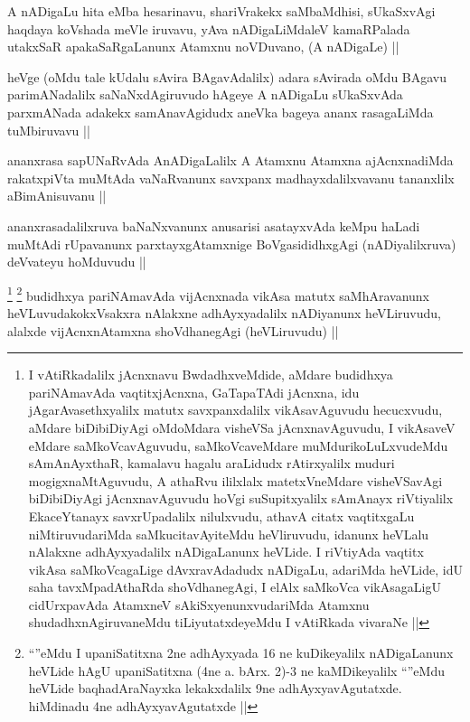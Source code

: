 
\begin{artha}
A nADigaLu hita eMba hesarinavu, shariVrakekx saMbaMdhisi, sUkaSxvAgi haqdaya koVshada meVle iruvavu, yAva nADigaLiMdaleV kamaRPalada utakxSaR apakaSaRgaLanunx Atamxnu noVDuvano, (A nADigaLe) ||
\end{artha}


\begin{artha}
heVge (oMdu tale kUdalu sAvira BAgavAdalilx) adara sAvirada oMdu BAgavu parimANadalilx saNaNxdAgiruvudo hAgeye A nADigaLu sUkaSxvAda parxmANada adakekx samAnavAgidudx aneVka bageya ananx rasagaLiMda tuMbiruvavu ||
\end{artha}


\begin{artha}
ananxrasa sapUNaRvAda AnADigaLalilx A Atamxnu Atamxna ajAcnxnadiMda rakatxpiVta muMtAda vaNaRvanunx savxpanx madhayxdalilxvavanu tananxlilx aBimAnisuvanu ||
\end{artha}

\begin{artha}
ananxrasadalilxruva baNaNxvanunx anusarisi asatayxvAda keMpu haLadi muMtAdi rUpavanunx parxtayxgAtamxnige BoVgasididhxgAgi (nADiyalilxruva) deVvateyu hoMduvudu ||
\end{artha}


\begin{artha}
\footnote{I vAtiRkadalilx jAcnxnavu BwdadhxveMdide, aMdare budidhxya pariNAmavAda vaqtitxjAcnxna, GaTapaTAdi jAcnxna, idu jAgarAvasethxyalilx matutx savxpanxdalilx vikAsavAguvudu hecucxvudu, aMdare biDibiDiyAgi oMdoMdara visheVSa jAcnxnavAguvudu, I vikAsaveV eMdare saMkoVcavAguvudu, saMkoVcaveMdare muMdurikoLuLxvudeMdu sAmAnAyxthaR, kamalavu hagalu araLidudx rAtirxyalilx muduri mogigxnaMtAguvudu, A athaRvu ililxlalx matetxVneMdare visheVSavAgi biDibiDiyAgi jAcnxnavAguvudu hoVgi suSupitxyalilx sAmAnayx riVtiyalilx EkaceYtanayx savxrUpadalilx nilulxvudu, athavA citatx vaqtitxgaLu niMtiruvudariMda saMkucitavAyiteMdu heVliruvudu, idanunx heVLalu nAlakxne adhAyxyadalilx nADigaLanunx heVLide. I riVtiyAda vaqtitx vikAsa saMkoVcagaLige dAvxravAdadudx nADigaLu, adariMda heVLide, idU saha tavxMpadAthaRda shoVdhanegAgi, I elAlx saMkoVca vikAsagaLigU cidUrxpavAda AtamxneV sAkiSxyenunxvudariMda Atamxnu shudadhxnAgiruvaneMdu tiLiyutatxdeyeMdu I vAtiRkada vivaraNe ||}
\footnote{``\stext''eMdu I upaniSatitxna 2ne adhAyxyada 16 ne kuDikeyalilx nADigaLanunx heVLide hAgU upaniSatitxna (4ne a. bArx. 2)-3 ne kaMDikeyalilx ``\stext''eMdu heVLide baqhadAraNayxka lekakxdalilx 9ne adhAyxyavAgutatxde. hiMdinadu 4ne adhAyxyavAgutatxde ||}
budidhxya pariNAmavAda vijAcnxnada vikAsa matutx saMhAravanunx heVLuvudakokxVsakxra nAlakxne adhAyxyadalilx nADiyanunx heVLiruvudu, alalxde vijAcnxnAtamxna shoVdhanegAgi (heVLiruvudu) ||
\end{artha}

